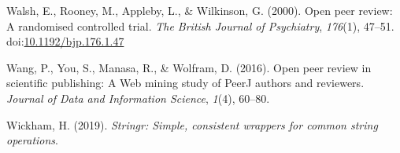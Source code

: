 \documentclass[,jou, a4paper,floatsintext]{apa6}
\begin{document}
\leavevmode\hypertarget{ref-walsh_open_2000}{}%
Walsh, E., Rooney, M., Appleby, L., \& Wilkinson, G. (2000). Open peer review: A randomised controlled trial. \emph{The British Journal of Psychiatry}, \emph{176}(1), 47--51. doi:\href{https://doi.org/10.1192/bjp.176.1.47}{10.1192/bjp.176.1.47}

\leavevmode\hypertarget{ref-wang_open_2016}{}%
Wang, P., You, S., Manasa, R., \& Wolfram, D. (2016). Open peer review in scientific publishing: A Web mining study of PeerJ authors and reviewers. \emph{Journal of Data and Information Science}, \emph{1}(4), 60--80.

\leavevmode\hypertarget{ref-wickham_stringr_2019}{}%
Wickham, H. (2019). \emph{Stringr: Simple, consistent wrappers for common string operations}.
\end{document}
